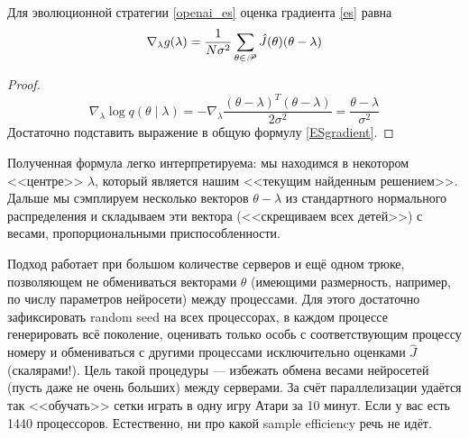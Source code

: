 \begin{theorem}
Для эволюционной стратегии \eqref{openai_es} оценка градиента \eqref{es} равна
\begin{equation}\label{openai_es_gradient}
\nabla_\lambda g(\lambda) = \frac{1}{N\sigma^2} \sum_{\theta \in \mathscr{P}} \hat{J}(\theta) (\theta - \lambda)
\end{equation}
\begin{proof}
$$\nabla_\lambda \log q(\theta \mid \lambda) = -\nabla_\lambda \frac{\left(\theta - \lambda \right)^T \left( \theta - \lambda \right)}{2 \sigma^2} = \frac{\theta - \lambda}{\sigma^2}$$
Достаточно подставить выражение в общую формулу \eqref{ESgradient}.
\end{proof}
\end{theorem}

Полученная формула легко интерпретируема: мы находимся в некотором <<центре>> $\lambda$, который является нашим <<текущим найденным решением>>. Дальше мы сэмплируем несколько векторов $\theta - \lambda$ из стандартного нормального распределения и складываем эти вектора (<<скрещиваем всех детей>>) с весами, пропорциональными приспособленности.


\begin{remark}
Подход работает при большом количестве серверов и ещё одном трюке, позволяющем не обмениваться векторами $\theta$ (имеющими размерность, например, по числу параметров нейросети) между процессами. Для этого достаточно зафиксировать random seed на всех процессорах, в каждом процессе генерировать всё поколение, оценивать только особь с соответствующим процессу номеру и обмениваться с другими процессами исключительно оценками $\hat{J}$ (скалярами!). Цель такой процедуры --- избежать обмена весами нейросетей (пусть даже не очень больших) между серверами. За счёт параллелизации удаётся так <<обучать>> сетки играть в одну игру Атари за 10 минут. Если у вас есть 1440 процессоров. Естественно, ни про какой sample efficiency речь не идёт. 
\end{remark}

\begin{example}[OpenAI-ES]
\begin{center}
\end{center}
\end{example}

